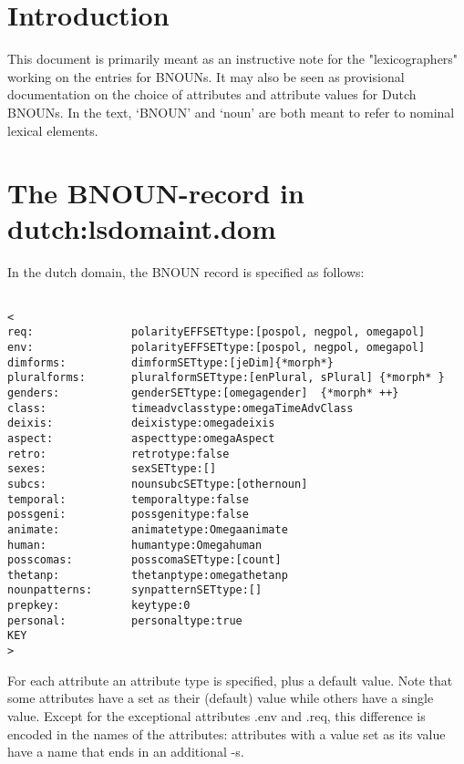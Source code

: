 

   \RosSupersedes{-}
   \MakeRosTitle
%
%
\section{Introduction}

This document is primarily meant as an instructive note for the
"lexicographers" working on the entries for BNOUNs.
It may also be seen as provisional 
documentation on the choice of attributes and attribute
values for Dutch BNOUNs. 
In the text, `BNOUN' and `noun' are both meant to refer to nominal
lexical elements.

\section{The BNOUN-record in dutch:lsdomaint.dom}
In the dutch domain, the BNOUN record is specified as follows:
\begin{verbatim}

<
req:               polarityEFFSETtype:[pospol, negpol, omegapol]   
env:               polarityEFFSETtype:[pospol, negpol, omegapol]
dimforms:          dimformSETtype:[jeDim]{*morph*}
pluralforms:       pluralformSETtype:[enPlural, sPlural] {*morph* } 
genders:           genderSETtype:[omegagender]  {*morph* ++} 
class:             timeadvclasstype:omegaTimeAdvClass
deixis:            deixistype:omegadeixis
aspect:            aspecttype:omegaAspect
retro:             retrotype:false
sexes:             sexSETtype:[]                        
subcs:             nounsubcSETtype:[othernoun]
temporal:          temporaltype:false
possgeni:          possgenitype:false
animate:           animatetype:Omegaanimate
human:             humantype:Omegahuman                 
posscomas:         posscomaSETtype:[count]
thetanp:           thetanptype:omegathetanp
nounpatterns:      synpatternSETtype:[]
prepkey:           keytype:0
personal:          personaltype:true
KEY              
>
\end{verbatim}

\newpage
For each attribute an attribute type is specified, plus a default value.
Note that some attributes have a set as their (default) value while
others have a single 
value. 
Except for the  exceptional attributes .env and .req,
this difference is encoded 
in the names of the attributes: attributes with a value set as its value have 
a name that ends in an additional -s.

